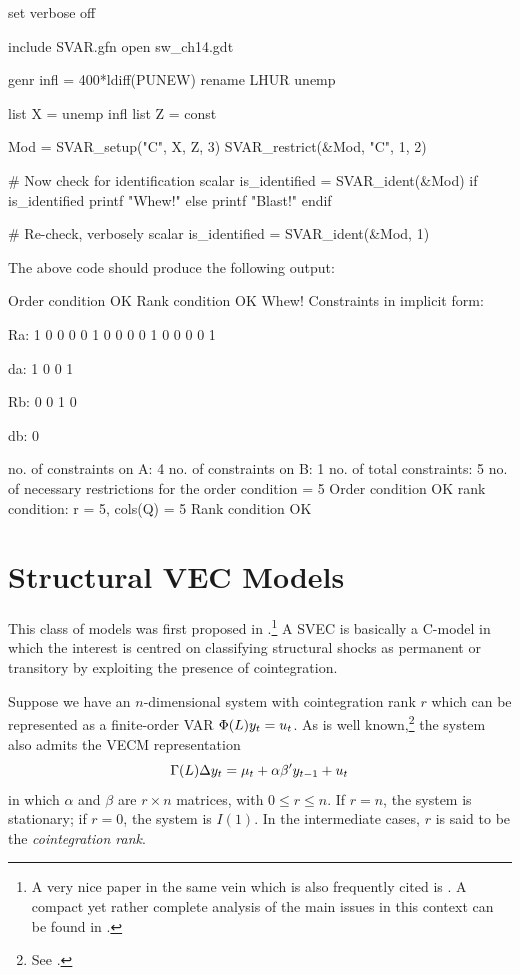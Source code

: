 \documentclass[a4paper,10pt]{article}
\newcommand{\PrE}[1]{\ensuremath u_{#1}} %
\newcommand{\VarSym}{\ensuremath \Phi}
\begin{document}
\begin{code}
set verbose off

include SVAR.gfn
open sw_ch14.gdt

genr infl = 400*ldiff(PUNEW)
rename LHUR unemp

list X = unemp infl
list Z = const

Mod = SVAR_setup("C", X, Z, 3)
SVAR_restrict(&Mod, "C", 1, 2)

# Now check for identification
scalar is_identified = SVAR_ident(&Mod)
if is_identified
    printf "Whew!\n"
else
    printf "Blast!\n"
endif

# Re-check, verbosely
scalar is_identified = SVAR_ident(&Mod, 1)
\end{code}

The above code should produce the following output:

\begin{code}
Order condition OK
Rank condition OK
Whew!
Constraints in implicit form:

Ra:
   1   0   0   0
   0   1   0   0
   0   0   1   0
   0   0   0   1

da:
   1
   0
   0
   1

Rb:
   0   0   1   0

db:
   0

no. of constraints on A: 4
no. of constraints on B: 1
no. of total constraints: 5
no. of necessary restrictions for the order condition = 5
Order condition OK
rank condition: r = 5, cols(Q) = 5
Rank condition OK
\end{code}

\section{Structural VEC Models}
\label{sec:SVECs}

This class of models was first proposed in \cite{KPSW91}.\footnote{A
  very nice paper in the same vein which is also frequently cited is
  \cite{GoNg2001}. A compact yet rather complete analysis of the main
  issues in this context can be found in \cite{Lut06}.} A SVEC is
basically a C-model in which the interest is centred on classifying
structural shocks as permanent or transitory by exploiting the
presence of cointegration.

Suppose we have an $n$-dimensional system with cointegration rank $r$
which can be represented as a finite-order VAR $\VarSym(L) y_t =
\PrE{t}$. As is well known,\footnote{See \cite{joha-book}.} the system
also admits the VECM representation
\begin{equation}
  \label{eq:VECM}
  \Gamma(L) \Delta y_t = \mu_t + \alpha \beta' y_{t-1} + \PrE{t}
\end{equation}
in which $\alpha$ and $\beta$ are $r \times n$ matrices, with $0 \le r
\le n$. If $r=n$, the system is stationary; if $r=0$, the system is
$I(1)$. In the intermediate cases, $r$ is said to be the
\emph{cointegration rank}.
\end{document}
